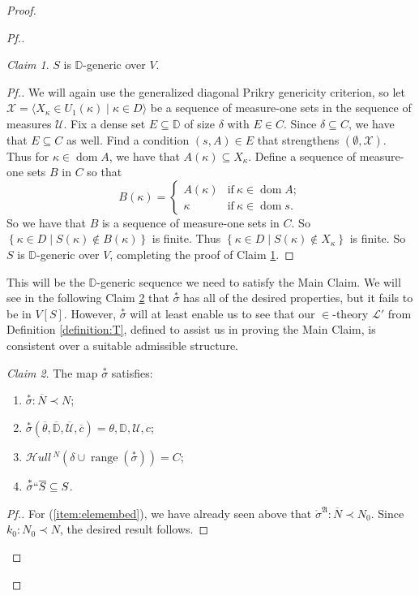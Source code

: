 \documentclass{amsart}
\theoremstyle{definition}
\theoremstyle{remark}
\newtheorem{claimno}{Claim}
\newcommand{\D}{\mathbb{D}}
\newcommand{\N}{{\overline{N}}}
\renewcommand{\S}{{\overline{S}}}
\newcommand{\U}{\mathcal{U}}
\DeclareMathOperator{\ran}{range}
\DeclareMathOperator{\dom}{dom}
\newcommand{\st}{\; | \;}
\newcommand{\set}[2]{\left\{#1\st #2 \right\}}
\newcommand{\seq}[2]{\langle #1 \st #2 \rangle}
\newcommand{\SH}{\mathcal{H}\textit{ull} \,}
\newcommand{\sk}[3]{\SH^{#1}( {#2} \cup {\ran(#3)} ) }
\begin{document}
\begin{proof}
\begin{proof}[Pf.]
\begin{claimno} \label{claim:SisDgenericOverV} $S$ is $\D$-generic over $V$. \end{claimno}
\begin{proof}[Pf.]
We will again use the generalized diagonal Prikry genericity criterion, so let $\mathcal X = \seq{ X_\kappa \in U_1(\kappa) }{ \kappa \in D }$ be a sequence of measure-one sets in the sequence of measures $\U$. Fix a dense set $E \subseteq \D$ of size $\delta$ with $E \in C$. Since $\delta \subseteq C$, we have that $E \subseteq C$ as well. Find a condition $(s,A) \in E$ that strengthens $(\emptyset, \mathcal X)$. Thus for $\kappa \in \dom A$, we have that $A(\kappa) \subseteq X_\kappa$. Define a sequence of measure-one sets $B$ in $C$ so that 
$$B(\kappa) = \begin{cases} A(\kappa) &\text{if} \ \kappa \in \dom A; \\ \kappa &\text{if} \ \kappa \in \dom s. \end{cases}$$
So we have that $B$ is a sequence of measure-one sets in $C$. So $\set{ \kappa \in D }{S(\kappa) \notin B(\kappa) }$ is finite. Thus $\set{\kappa \in D}{ S(\kappa) \notin X_\kappa}$ is finite. So $S$ is $\D$-generic over $V$, completing the proof of Claim \ref{claim:SisDgenericOverV}.
\end{proof}

This will be the $\D$-generic sequence we need to satisfy the Main Claim. We will see in the following Claim \ref{claim:starsigmaisgood} that $\overset{*} \sigma$ has all of the desired properties, but it fails to be in $V[S]$. However, $\overset{*}{\sigma}$ will at least enable us to see that our $\in$-theory $\mathcal L'$ from Definition \ref{definition:T}, defined to assist us in proving the Main Claim, is consistent over a suitable admissible structure.
\begin{claimno} \label{claim:starsigmaisgood} The map $\overset{*}{\sigma}$ satisfies:
\begin{enumerate}
	\item \label{item:elemembed} $\overset{*} {\sigma}: \N \prec N$;
	\item \label{item:rangematches} $\overset{*} {\sigma}(\overline \theta, \overline{\D}, \overline{\U}, \overline c)=\theta, \D, \U, c$;
	\item \label{item:skolemC} $\sk{N}{\delta}{\overset{*}{\sigma}} = C$;	
	\item \label{item:lifts} $\overset{*} {\sigma} `` \S \subseteq S$.
\end{enumerate}
\end{claimno}
\begin{proof}[Pf.]
For (\ref{item:elemembed}), we have already seen above that $\mathring \sigma^{\mathfrak A}: \N \prec N_0$. Since $k_0:N_0 \prec N$, the desired result follows.


\end{proof}
\end{proof}
\end{proof}
\end{document}
